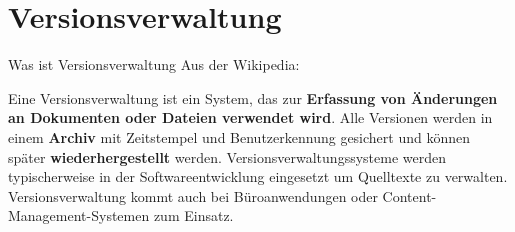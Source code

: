 \section{Versionsverwaltung}

\begin{frame}
  \tableofcontents[currentsection]
\end{frame}

\begin{frame}{Was ist Versionsverwaltung}
Aus der Wikipedia:

Eine Versionsverwaltung ist ein System,
das zur \textbf{Erfassung von Änderungen an
Dokumenten oder Dateien verwendet wird}.
Alle Versionen werden in einem \textbf{Archiv} mit
Zeitstempel und Benutzerkennung gesichert und können
später \textbf{wiederhergestellt} werden.
Versionsverwaltungssysteme werden typischerweise in der
Softwareentwicklung eingesetzt um Quelltexte zu verwalten.
Versionsverwaltung kommt auch bei Büroanwendungen oder
Content-Management-Systemen zum Einsatz.
\end{frame}

